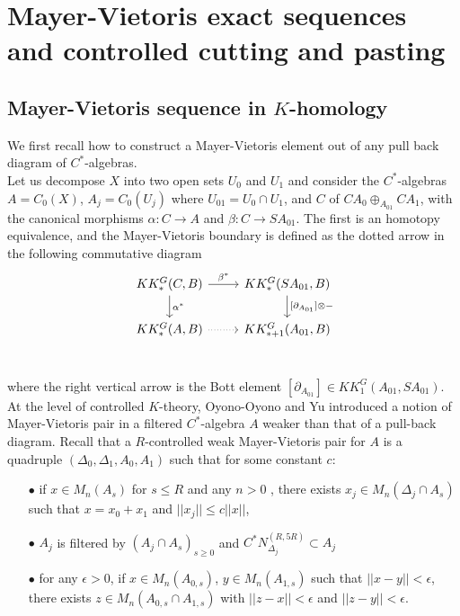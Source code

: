 \section{ Mayer-Vietoris exact sequences and controlled cutting and pasting}

\subsection{Mayer-Vietoris sequence in $K$-homology}

We first recall how to construct a Mayer-Vietoris element out of any pull back diagram of $C^*$-algebras.\\

Let us decompose $X$ into two open sets $U_0$ and $U_1$ and consider the $C^*$-algebras $A=C_0(X)$, $A_j=C_0(U_j)$ where $U_{01}=U_0\cap U_1$, and $C$ of $C A_0\oplus_{A_{01}} C A_1$, with the canonical morphisms $\alpha :C \rightarrow A$ and $\beta : C \rightarrow SA_{01}$. The first is an homotopy equivalence, and the Mayer-Vietoris boundary is defined as the dotted arrow in the following commutative diagram
\[\begin{tikzcd}
KK^G_*(C,B) \arrow{r}{\beta^*}\arrow{d}{ \alpha^*}& KK^G_*(SA_{01},B)\arrow{d}{[\partial_{A_{01}}]\otimes -}\\
KK^G_*(A,B) \arrow[dotted]{r}& KK^G_{*+1}(A_{01},B)\\
\end{tikzcd}\]

where the right vertical arrow is the Bott element $[\partial_{A_{01}}]\in KK_1^G(A_{01},SA_{01})$.\\

At the level of controlled $K$-theory, Oyono-Oyono and Yu introduced a notion of Mayer-Vietoris pair in a filtered $C^*$-algebra $A$ weaker than that of a pull-back diagram. Recall that a $R$-controlled weak Mayer-Vietoris pair for $A$ is a quadruple $(\Delta_0,\Delta_1,A_0,A_1)$ such that for some constant $c$:\\

\begin{itemize}
\item[$\bullet$] if $x\in M_n(A_s)$ for $s\leq R$ and any $n>0$ , there exists $x_j\in M_n(\Delta_j\cap A_s)$ such that $x=x_0+x_1$ and $||x_j||\leq c||x||$,
\item[$\bullet$] $A_j$ is filtered by $(A_j\cap A_s)_{s\geq 0}$ and $C^* N_{\Delta_j}^{(R,5R)}\subset A_j$
\item[$\bullet$] for any $\epsilon >0$, if $x\in M_n(A_{0,s})$, $y\in M_n(A_{1,s})$ such that $||x-y||<\epsilon$,  there exists $z\in M_n(A_{0,s}\cap A_{1,s})$ with $||z-x||<\epsilon$ and $||z-y||<\epsilon$. \\
\end{itemize}

